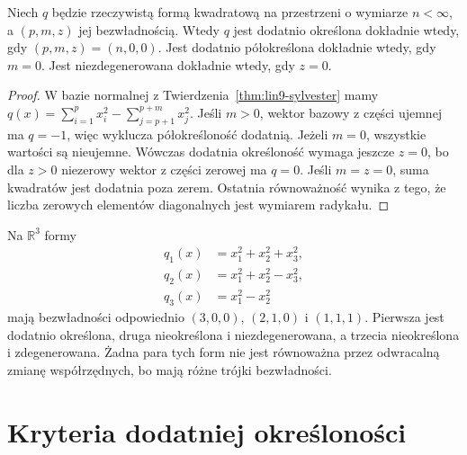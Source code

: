 \begin{wniosek}
\label{cor:lin9-dodatnia-bezwladnosc}
Niech \(q\) będzie rzeczywistą
formą kwadratową na przestrzeni
o wymiarze \(n<\infty\),
a \((p,m,z)\) jej bezwładnością.
Wtedy \(q\) jest
dodatnio określona dokładnie
wtedy, gdy \((p,m,z)=(n,0,0)\).
Jest dodatnio półokreślona
dokładnie wtedy, gdy \(m=0\).
Jest niezdegenerowana dokładnie
wtedy, gdy \(z=0\).
\end{wniosek}
\begin{proof}
W bazie normalnej z
Twierdzenia~\ref{thm:lin9-sylvester}
mamy
\(q(x)=\sum_{i=1}^p x_i^2
-\sum_{j=p+1}^{p+m}x_j^2\).
Jeśli \(m>0\), wektor bazowy
z części ujemnej ma \(q=-1\),
więc wyklucza półokreśloność
dodatnią. Jeżeli \(m=0\),
wszystkie wartości są
nieujemne. Wówczas
dodatnia określoność wymaga
jeszcze \(z=0\), bo
dla \(z>0\) niezerowy wektor
z części zerowej ma \(q=0\).
Jeśli \(m=z=0\), suma
kwadratów jest dodatnia
poza zerem. Ostatnia
równoważność wynika z
tego, że liczba zerowych
elementów diagonalnych
jest wymiarem radykału.
\end{proof}

\begin{przyklad}
\label{prz:lin9-sygnatury}
Na \(\mathbb R^3\) formy
\[
 \begin{aligned}
 q_1(x)&=x_1^2+x_2^2+x_3^2,\\
 q_2(x)&=x_1^2+x_2^2-x_3^2,\\
 q_3(x)&=x_1^2-x_2^2
 \end{aligned}
\]
mają bezwładności odpowiednio
\((3,0,0)\), \((2,1,0)\)
i \((1,1,1)\).
Pierwsza jest dodatnio
określona, druga nieokreślona
i niezdegenerowana,
a trzecia nieokreślona
i zdegenerowana.
Żadna para tych form
nie jest równoważna przez
odwracalną zmianę współrzędnych,
bo mają różne trójki bezwładności.
\end{przyklad}


\section{Kryteria dodatniej określoności}
\label{sec:lin9-kryterium-sylvestera}

